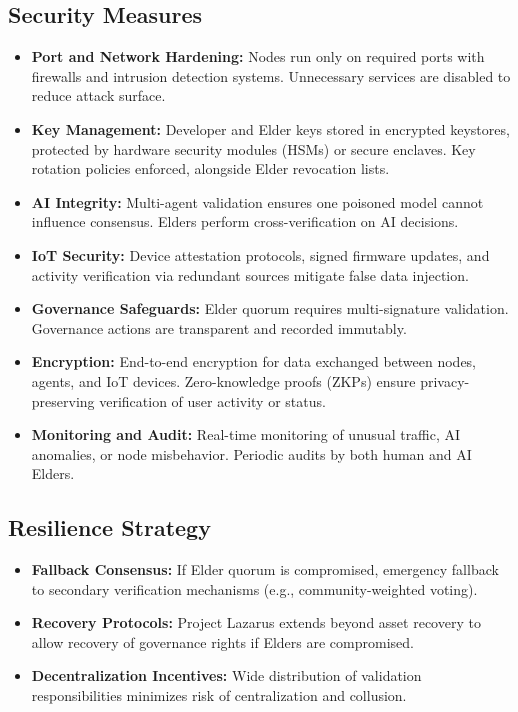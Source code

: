 \documentclass[11pt,a4paper]{article}
\begin{document}
\subsection{Security Measures}
\begin{itemize}
    \item \textbf{Port and Network Hardening:} Nodes run only on required ports with firewalls and intrusion detection systems. Unnecessary services are disabled to reduce attack surface.
    \item \textbf{Key Management:} Developer and Elder keys stored in encrypted keystores, protected by hardware security modules (HSMs) or secure enclaves. Key rotation policies enforced, alongside Elder revocation lists.
    \item \textbf{AI Integrity:} Multi-agent validation ensures one poisoned model cannot influence consensus. Elders perform cross-verification on AI decisions.
    \item \textbf{IoT Security:} Device attestation protocols, signed firmware updates, and activity verification via redundant sources mitigate false data injection.
    \item \textbf{Governance Safeguards:} Elder quorum requires multi-signature validation. Governance actions are transparent and recorded immutably.
    \item \textbf{Encryption:} End-to-end encryption for data exchanged between nodes, agents, and IoT devices. Zero-knowledge proofs (ZKPs) ensure privacy-preserving verification of user activity or status.
    \item \textbf{Monitoring and Audit:} Real-time monitoring of unusual traffic, AI anomalies, or node misbehavior. Periodic audits by both human and AI Elders.
\end{itemize}

\subsection{Resilience Strategy}
\begin{itemize}
    \item \textbf{Fallback Consensus:} If Elder quorum is compromised, emergency fallback to secondary verification mechanisms (e.g., community-weighted voting).
    \item \textbf{Recovery Protocols:} Project Lazarus extends beyond asset recovery to allow recovery of governance rights if Elders are compromised.
    \item \textbf{Decentralization Incentives:} Wide distribution of validation responsibilities minimizes risk of centralization and collusion.
\end{itemize}
\end{document}
